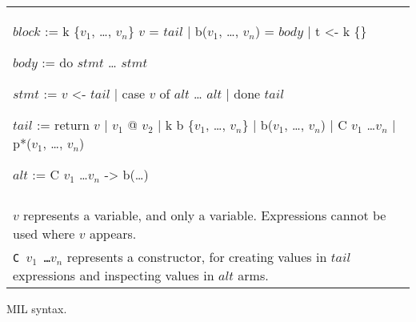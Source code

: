 \begin{myfig}[th]
\begin{tabular}{p{5in}}
\begin{center}
\begin{minipage}{4in}
\begin{AVerb}[numbers=left]
  $block$ := k \{$v_1$, \dots, $v_n$\} $v$ = $tail$ \label{fig_mil3_k1} 
    | b($v_1$, \dots, $v_n$) = $body$ \label{fig_mil3_b} 
    | t <- k \{\}  \label{fig_mil3_t} 

  $body$ := do \label{fig_mil3_body}
    $stmt$ 
    \dots 
    $stmt$

  $stmt$ := $v$ <- $tail$ \label{fig_mil3_stmt}  \label{fig_mil3_bind}
    | case $v$ of \label{fig_mil3_case}
        $alt$
        \dots
        $alt$
    | done $tail$ \label{fig_mil3_done}

  $tail$ := return $v$ \label{fig_mil3_return}
    | $v_1$ @ $v_2$ \label{fig_mil3_enter}
    | k b \{$v_1$, \dots, $v_n$\} \label{fig_mil3_capture}
    | b($v_1$, \dots, $v_n$) \label{fig_mil3_goto}
    | C $v_1$ \dots $v_n$ \label{fig_mil3_const}
    | p*($v_1$, \dots, $v_n$) \label{fig_mil3_prim}

  $alt$ := C $v_1$ \dots $v_n$ -> b(\dots) 
\end{AVerb}
\end{minipage}
\end{center} \\ \\
  $v$ represents a variable, and only a variable. Expressions
  cannot be used where $v$ appears. \\ 

  \texttt{C $v_1$ \dots $v_n$} represents a constructor, for creating
  values in $tail$ expressions and inspecting values in $alt$ arms. \\
\end{tabular}
\caption{MIL syntax.}
\label{fig_mil3}
\end{myfig}
